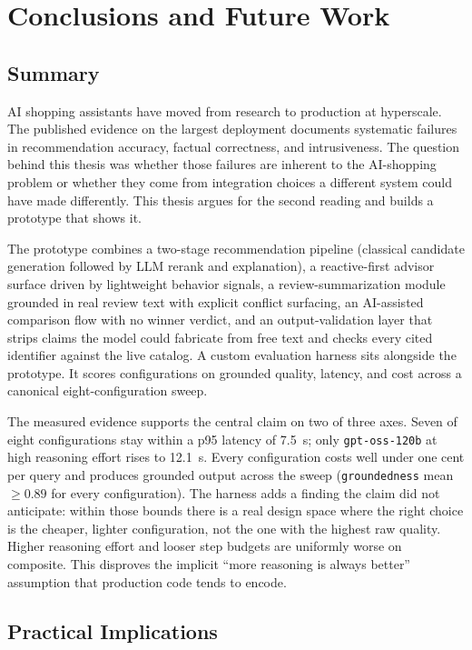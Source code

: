 \chapter{Conclusions and Future Work}
\label{chap:conclusions}

\section{Summary}
\label{sec:concl-summary}

AI shopping assistants have moved from research to production at
hyperscale. The published evidence on the largest deployment
documents systematic failures in recommendation accuracy, factual
correctness, and intrusiveness. The question behind this thesis
was whether those failures are inherent to the AI-shopping
problem or whether they come from integration choices a
different system could have made differently. This thesis argues
for the second reading and builds a prototype that shows it.

The prototype combines a two-stage recommendation pipeline
(classical candidate generation followed by LLM rerank and
explanation), a reactive-first advisor surface driven by
lightweight behavior signals, a review-summarization module
grounded in real review text with explicit conflict surfacing,
an AI-assisted comparison flow with no winner verdict, and an
output-validation layer that strips claims the model could
fabricate from free text and checks every cited identifier
against the live catalog.
A custom evaluation harness sits alongside the prototype. It
scores configurations on grounded quality, latency, and cost
across a canonical eight-configuration sweep.

The measured evidence supports the central claim on two of three
axes. Seven of eight configurations stay within a p95 latency of
7.5~s; only \texttt{gpt-oss-120b} at high reasoning effort
rises to 12.1~s. Every configuration costs well under one cent
per query and produces grounded output across the sweep
(\texttt{groundedness} mean $\ge 0.89$ for every configuration).
The harness adds a finding the claim did not anticipate: within
those bounds there is a real design space where the right choice
is the cheaper, lighter configuration, not the one with the
highest raw quality. Higher reasoning
effort and looser step budgets are uniformly worse on composite.
This disproves the implicit ``more reasoning is always better''
assumption that production code tends to encode.

\section{Practical Implications}
\label{sec:concl-implications}

